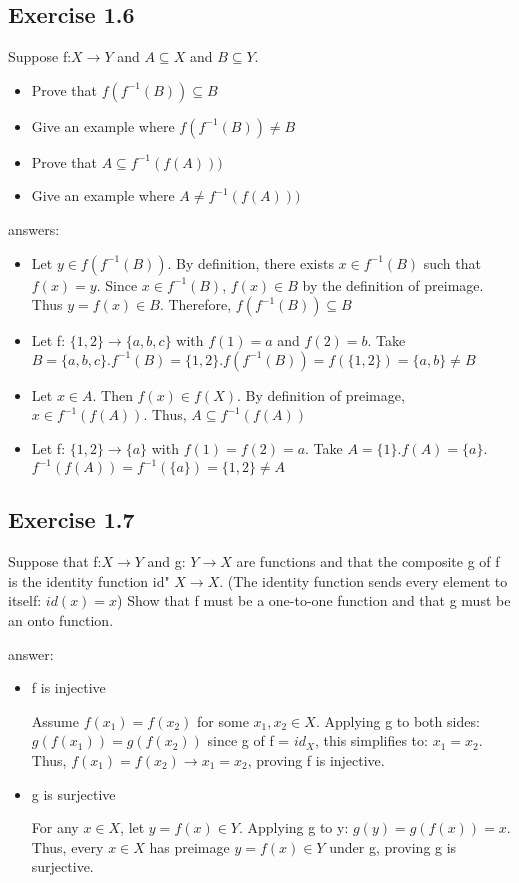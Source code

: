 \documentclass[12pt]{article}
\begin{document}
		\subsection*{Exercise 1.6}
			Suppose f:$X \rightarrow Y$ and $A \subseteq X$ and $B \subseteq Y$.
			\begin{itemize}
				\item Prove that $f(f^{-1}(B)) \subseteq B$
				\item Give an example where $f(f^{-1}(B)) \ne B$
				\item Prove that $A \subseteq f^{-1}(f(A)))$
				\item Give an example where $A \ne f^{-1}(f(A)))$
			\end{itemize}
			answers:
			\begin{itemize}
				\item Let $y \in f(f^{-1}(B))$. By definition, there exists $x \in f^{-1}(B)$ such that $f(x) = y$. Since $x \in f^{-1}(B)$, $f(x) \in B$ by the definition of preimage. Thus $y = f(x) \in B$. Therefore, $f(f^{-1}(B)) \subseteq B$
				\item Let f: $\{1,2\} \rightarrow \{a,b,c\}$ with $f(1) = a$ and $f(2) = b$. Take $B = \{a,b,c\}. f^{-1}(B) = \{1,2\}. f(f^{-1}(B)) = f(\{1,2\}) = \{a,b\} \ne B$
				\item Let $x \in A$. Then $f(x) \in f(X)$. By definition of preimage, $x \in f^{-1}(f(A))$. Thus, $A \subseteq f^{-1}(f(A))$
				\item Let f: $\{1,2\} \rightarrow \{a\}$ with $f(1) = f(2) = a$. Take $A = \{1\}. f(A) = \{a\}$. $f^{-1}(f(A)) = f^{-1}(\{a\}) = \{1,2\} \ne A$
			\end{itemize}
		\subsection*{Exercise 1.7}
			Suppose that f:$X \rightarrow Y$ and g: $Y \rightarrow X$ are functions and that the composite g of f is the identity function id" $X \rightarrow X$. (The identity function sends every element to itself: $id(x)=x$) Show that f must be a one-to-one function and that g must be an onto function.
			
			answer:
			\begin{itemize}
				\item f is injective
				
				Assume $f(x_1) = f(x_2)$ for some $x_1, x_2 \in X$. Applying g to both sides: $g(f(x_1)) = g(f(x_2))$ since g of f = $id_X$, this simplifies to: $x_1 = x_2$. Thus, $f(x_1) = f(x_2) \rightarrow x_1 = x_2$, proving f is injective.
				\item g is surjective
				
				For any $x \in X$, let $y = f(x) \in Y$. Applying g to y: $g(y) = g(f(x)) = x$. Thus, every $x \in X$ has preimage $y = f(x) \in Y$ under g, proving g is surjective.
			\end{itemize}
\end{document}
